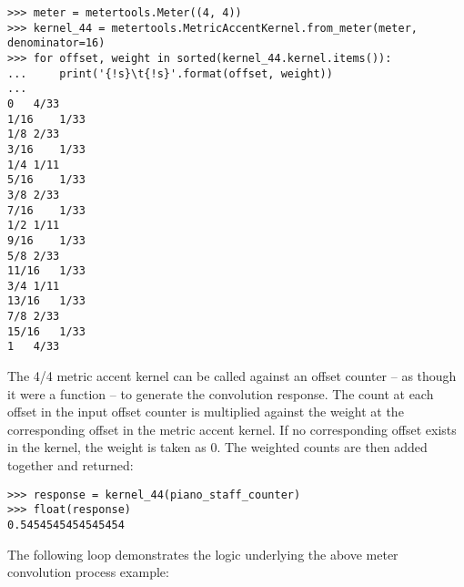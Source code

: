\begin{comment}
<abjad>
meter = metertools.Meter((4, 4))
kernel_44 = metertools.MetricAccentKernel.from_meter(meter, denominator=16)
for offset, weight in sorted(kernel_44.kernel.items()):
    print('{!s}\t{!s}'.format(offset, weight))

</abjad>
\end{comment}

\begin{abjadbookoutput}
\begin{singlespacing}
\vspace{-0.5\baselineskip}
\begin{lstlisting}
>>> meter = metertools.Meter((4, 4))
>>> kernel_44 = metertools.MetricAccentKernel.from_meter(meter, denominator=16)
>>> for offset, weight in sorted(kernel_44.kernel.items()):
...     print('{!s}\t{!s}'.format(offset, weight))
...
0	4/33
1/16	1/33
1/8	2/33
3/16	1/33
1/4	1/11
5/16	1/33
3/8	2/33
7/16	1/33
1/2	1/11
9/16	1/33
5/8	2/33
11/16	1/33
3/4	1/11
13/16	1/33
7/8	2/33
15/16	1/33
1	4/33
\end{lstlisting}
\end{singlespacing}
\end{abjadbookoutput}

\noindent The 4/4 metric accent kernel can be called against an offset counter
-- as though it were a function -- to generate the convolution response. The
count at each offset in the input offset counter is multiplied against the
weight at the corresponding offset in the metric accent kernel. If no
corresponding offset exists in the kernel, the weight is taken as 0. The
weighted counts are then added together and returned:

\begin{comment}
<abjad>
response = kernel_44(piano_staff_counter)
float(response)
</abjad>
\end{comment}

\begin{abjadbookoutput}
\begin{singlespacing}
\vspace{-0.5\baselineskip}
\begin{lstlisting}
>>> response = kernel_44(piano_staff_counter)
>>> float(response)
0.5454545454545454
\end{lstlisting}
\end{singlespacing}
\end{abjadbookoutput}

\noindent The following loop demonstrates the logic underlying the above meter
convolution process example:

